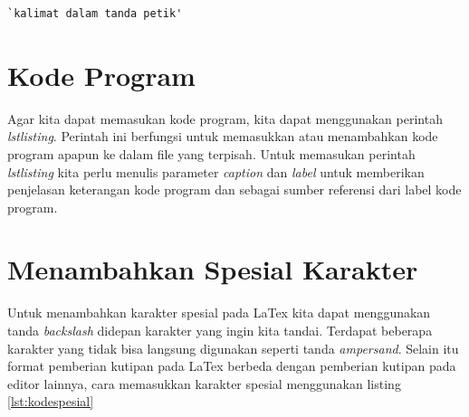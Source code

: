 \begin{lstlisting}[caption=Contoh kalimat dalam tanda petik pada Latex,label={lst:tandapetik}]
`kalimat dalam tanda petik'
\end{lstlisting}


\section{Kode Program}
Agar kita dapat memasukan kode program, kita dapat menggunakan perintah \textit{lstlisting}. Perintah ini  berfungsi untuk memasukkan atau menambahkan kode program apapun ke dalam file yang terpisah. Untuk memasukan perintah \textit{lstlisting} kita perlu menulis parameter \textit{caption} dan \textit{label} untuk memberikan penjelasan keterangan kode program dan sebagai sumber referensi dari label kode program.




\section{Menambahkan Spesial Karakter}
Untuk menambahkan karakter spesial pada LaTex kita dapat menggunakan tanda \textit{backslash} didepan karakter yang ingin kita tandai. Terdapat beberapa karakter yang tidak bisa langsung digunakan seperti tanda \textit{ampersand}. Selain itu format pemberian kutipan pada LaTex berbeda dengan pemberian kutipan pada editor lainnya, cara memasukkan karakter spesial menggunakan listing \ref{lst:kodespesial}


